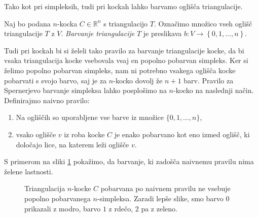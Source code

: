 \documentclass[mat1]{fmfdelo}
\newcommand{\R}{\mathbb R}
\newcommand{\0}{\underline{0}}
\begin{document}
Tako kot pri simpleksih, tudi pri kockah lahko barvamo oglišča triangulacije.
\begin{definicija}
Naj bo podana $n$-kocka $C \in \R^n$ s triangulacijo $T$. Označimo množico vseh oglišč triangulacije $T$ z $V$. \emph{Barvanje triangulacije} $T$ je preslikava $b : V \to \left \{0, 1, \dots, n \right \}$.
\end{definicija}
Tudi pri kockah bi si želeli tako pravilo za barvanje triangulacije kocke, da bi vsaka triangulacija kocke vsebovala vsaj en popolno pobarvan simpleks. Ker si želimo popolno pobarvan simpleks, nam ni potrebno vsakega oglišča kocke pobarvati s svojo barvo, saj je za $n$-kocko dovolj že $n+1$ barv.  Pravilo za Spernerjevo barvanje simpleksa lahko posplošimo na $n$-kocko na naslednji način.
Definirajmo naivno pravilo:
\begin{enumerate}
\item Na ogliščih so uporabljene vse barve iz množice $\{0, 1, \dots, n \}$,
\item vsako oglišče $v$ iz roba kocke $C$ je enako pobarvano kot eno izmed oglišč, ki določajo lice, na katerem leži oglišče $v$.
\end{enumerate}
S primerom na sliki \ref{fig:ni-pop} pokažimo, da barvanje, ki zadošča naivnemu pravilu nima želene lastnosti.
\begin{figure}[h!]
	\centering
{}
	\caption{Triangulacija $n$-kocke $C$ pobarvana po naivnem pravilu ne vsebuje popolno pobarvanega $n$-simpleksa. Zaradi lepše slike, smo barvo $0$ prikazali z modro, barvo $1$ z rdečo, $2$ pa z zeleno.}\label{fig:ni-pop}
\end{figure}
\end{document}
